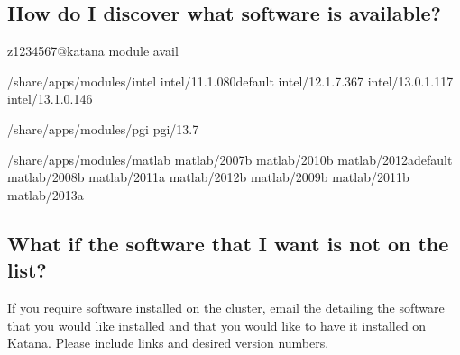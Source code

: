 \documentclass[letterpaper,10pt,english]{sphinxmanual}
\begin{document}
\subsection{How do I discover what software is available?}
\label{\detokenize{software/environment_modules:how-do-i-discover-what-software-is-available}}
\begin{sphinxVerbatim}[commandchars=\\\{\}]
\PYG{o}{[}z1234567@katana \PYGZti{}\PYG{o}{]}\PYGZdl{} module avail

\PYGZhy{}\PYGZhy{}\PYGZhy{}\PYGZhy{}\PYGZhy{}\PYGZhy{}\PYGZhy{}\PYGZhy{}\PYGZhy{}\PYGZhy{}\PYGZhy{}\PYGZhy{}\PYGZhy{}\PYGZhy{}\PYGZhy{}\PYGZhy{}\PYGZhy{}\PYGZhy{}\PYGZhy{}\PYGZhy{}\PYGZhy{}\PYGZhy{}\PYGZhy{}\PYGZhy{}\PYGZhy{}\PYGZhy{} /share/apps/modules/intel \PYGZhy{}\PYGZhy{}\PYGZhy{}\PYGZhy{}\PYGZhy{}\PYGZhy{}\PYGZhy{}\PYGZhy{}\PYGZhy{}\PYGZhy{}\PYGZhy{}\PYGZhy{}\PYGZhy{}\PYGZhy{}\PYGZhy{}\PYGZhy{}\PYGZhy{}\PYGZhy{}\PYGZhy{}\PYGZhy{}\PYGZhy{}\PYGZhy{}\PYGZhy{}\PYGZhy{}\PYGZhy{}\PYGZhy{}\PYGZhy{}
intel/11.1.080default  intel/12.1.7.367  intel/13.0.1.117  intel/13.1.0.146

\PYGZhy{}\PYGZhy{}\PYGZhy{}\PYGZhy{}\PYGZhy{}\PYGZhy{}\PYGZhy{}\PYGZhy{}\PYGZhy{}\PYGZhy{}\PYGZhy{}\PYGZhy{}\PYGZhy{}\PYGZhy{}\PYGZhy{}\PYGZhy{}\PYGZhy{}\PYGZhy{}\PYGZhy{}\PYGZhy{}\PYGZhy{}\PYGZhy{}\PYGZhy{}\PYGZhy{}\PYGZhy{}\PYGZhy{}\PYGZhy{} /share/apps/modules/pgi \PYGZhy{}\PYGZhy{}\PYGZhy{}\PYGZhy{}\PYGZhy{}\PYGZhy{}\PYGZhy{}\PYGZhy{}\PYGZhy{}\PYGZhy{}\PYGZhy{}\PYGZhy{}\PYGZhy{}\PYGZhy{}\PYGZhy{}\PYGZhy{}\PYGZhy{}\PYGZhy{}\PYGZhy{}\PYGZhy{}\PYGZhy{}\PYGZhy{}\PYGZhy{}\PYGZhy{}\PYGZhy{}\PYGZhy{}\PYGZhy{}\PYGZhy{}
pgi/13.7

\PYGZhy{}\PYGZhy{}\PYGZhy{}\PYGZhy{}\PYGZhy{}\PYGZhy{}\PYGZhy{}\PYGZhy{}\PYGZhy{}\PYGZhy{}\PYGZhy{}\PYGZhy{}\PYGZhy{}\PYGZhy{}\PYGZhy{}\PYGZhy{}\PYGZhy{}\PYGZhy{}\PYGZhy{}\PYGZhy{}\PYGZhy{}\PYGZhy{}\PYGZhy{}\PYGZhy{}\PYGZhy{}\PYGZhy{} /share/apps/modules/matlab \PYGZhy{}\PYGZhy{}\PYGZhy{}\PYGZhy{}\PYGZhy{}\PYGZhy{}\PYGZhy{}\PYGZhy{}\PYGZhy{}\PYGZhy{}\PYGZhy{}\PYGZhy{}\PYGZhy{}\PYGZhy{}\PYGZhy{}\PYGZhy{}\PYGZhy{}\PYGZhy{}\PYGZhy{}\PYGZhy{}\PYGZhy{}\PYGZhy{}\PYGZhy{}\PYGZhy{}\PYGZhy{}\PYGZhy{}
matlab/2007b          matlab/2010b          matlab/2012adefault
matlab/2008b          matlab/2011a          matlab/2012b
matlab/2009b          matlab/2011b          matlab/2013a
\end{sphinxVerbatim}


\subsection{What if the software that I want is not on the list?}
\label{\detokenize{software/environment_modules:what-if-the-software-that-i-want-is-not-on-the-list}}
If you require software installed on the cluster, email the  detailing the software that you would like installed and that you would like to have it installed on Katana. Please include links and desired version numbers.
\end{document}
